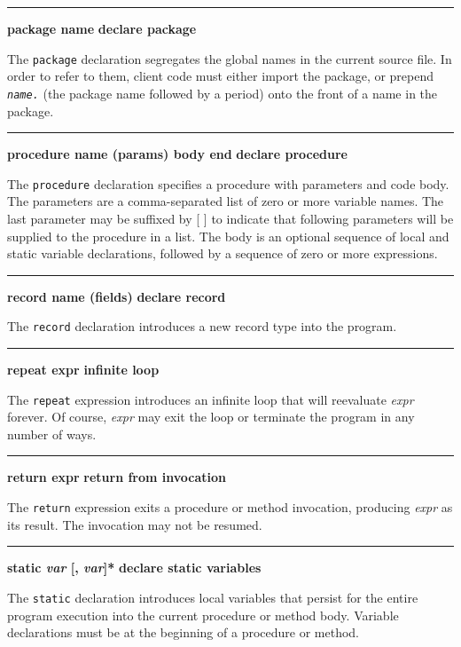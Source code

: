 \bigskip\hrule\vspace{0.1cm}
\noindent
{\bf package name } \hfill {\bf declare package}

\noindent
{}The \texttt{package} declaration segregates the global
names in the current source file. In order to refer to them, client
code must either import the package, or prepend
\texttt{\textit{name.}} (the package name followed by a period)
onto the front of a name in the package.

\bigskip\hrule\vspace{0.1cm}
\noindent
{\bf procedure name (params) body end } \hfill {\bf declare procedure}

\noindent
{}The \texttt{procedure} declaration specifies a
procedure with parameters and code body. The parameters
are a comma-separated list of zero or more variable names. The last
parameter may be suffixed by [ ] to indicate that
following parameters will be supplied to the procedure in a list. The
body is an optional sequence of local and static variable declarations,
followed by a sequence of zero or more expressions.

\bigskip\hrule\vspace{0.1cm}
\noindent
{\bf record name (fields) } \hfill {\bf declare record}

\noindent
{}The \texttt{record} declaration introduces a new record
type into the program.

\bigskip\hrule\vspace{0.1cm}
\noindent
{\bf repeat expr } \hfill {\bf infinite loop}

\noindent
{}The \texttt{repeat} expression
introduces an infinite loop that will reevaluate \textit{expr} forever.
Of course, \textit{expr} may exit the loop or terminate the program in
any number of ways.

\bigskip\hrule\vspace{0.1cm}
\noindent
{\bf return expr } \hfill {\bf return from invocation}

\noindent
{}The \texttt{return} expression exits a procedure or method
invocation, producing \textit{expr} as its result. The invocation may
not be resumed.

\bigskip\hrule\vspace{0.1cm}
\noindent
{\bf \textbf{static} \textit{var} [, \textit{var}]* } \hfill {\bf declare static variables}

\noindent
{}The \texttt{static} declaration introduces 
local variables that persist for the entire program execution
into the current procedure or method body. Variable
declarations must be at the beginning of a procedure or method.

